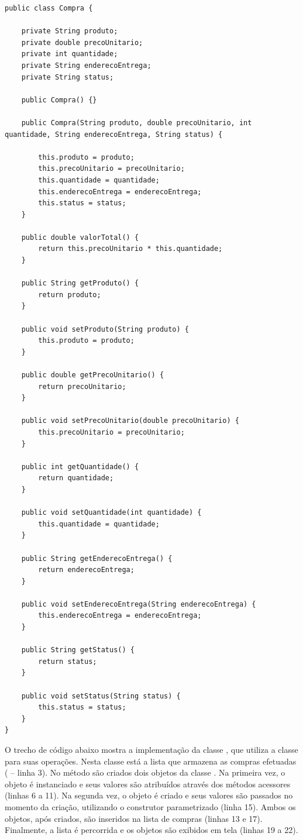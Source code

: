 \begin{verbatim}
public class Compra {

	private String produto;
	private double precoUnitario;
	private int quantidade;
	private String enderecoEntrega;
	private String status;
	
	public Compra() {}
	
	public Compra(String produto, double precoUnitario, int quantidade, String enderecoEntrega, String status) {
	
		this.produto = produto;
		this.precoUnitario = precoUnitario;
		this.quantidade = quantidade;
		this.enderecoEntrega = enderecoEntrega;
		this.status = status;
	}
	
	public double valorTotal() {
		return this.precoUnitario * this.quantidade;
	}
	
	public String getProduto() {
		return produto;
	}
	
	public void setProduto(String produto) {
		this.produto = produto;
	}
	
	public double getPrecoUnitario() {
		return precoUnitario;
	}
	
	public void setPrecoUnitario(double precoUnitario) {
		this.precoUnitario = precoUnitario;
	}
	
	public int getQuantidade() {
		return quantidade;
	}
	
	public void setQuantidade(int quantidade) {
		this.quantidade = quantidade;
	}
	
	public String getEnderecoEntrega() {
		return enderecoEntrega;
	}
	
	public void setEnderecoEntrega(String enderecoEntrega) {
		this.enderecoEntrega = enderecoEntrega;
	}
	
	public String getStatus() {
		return status;
	}
	
	public void setStatus(String status) {
		this.status = status;
	}
}
\end{verbatim}

O trecho de código abaixo mostra a implementação da classe , que utiliza a classe  para suas operações. Nesta classe está a lista que armazena as compras efetuadas ( -- linha 3). No método  são criados dois objetos da classe . Na primeira vez, o objeto é instanciado e seus valores são atribuídos através dos métodos acessores (linhas 6 a 11). Na segunda vez, o objeto é criado e seus valores são passados no momento da criação, utilizando o construtor parametrizado (linha 15). Ambos os objetos, após criados, são inseridos na lista de compras (linhas 13 e 17). Finalmente, a lista é percorrida e os objetos são exibidos em tela (linhas 19 a 22).

